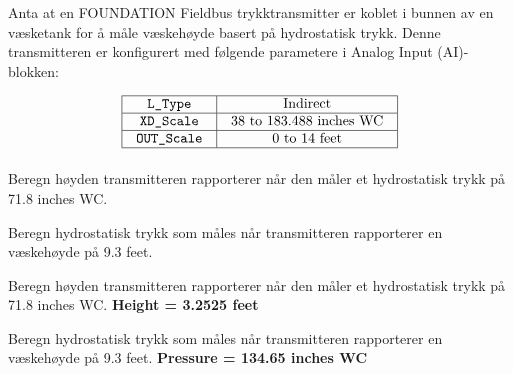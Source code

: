 

Anta at en FOUNDATION Fieldbus trykktransmitter er koblet i bunnen av en væsketank for å måle væskehøyde basert på hydrostatisk trykk. Denne transmitteren er konfigurert med følgende parametere i Analog Input (AI)-blokken:


$$\vbox{\offinterlineskip
\halign{\strut
\vrule \quad\hfil # \ \hfil & 
\vrule \quad\hfil # \ \hfil \vrule \cr
\noalign{\hrule}
%
{\tt L\_Type} & Indirect \cr
%
\noalign{\hrule}
%
{\tt XD\_Scale} & 38 to 183.488 inches WC \cr
%
\noalign{\hrule}
%
{\tt OUT\_Scale} & 0 to 14 feet \cr
%
\noalign{\hrule}
} %
}$$ %

\vskip 10pt

Beregn høyden transmitteren rapporterer når den måler et hydrostatisk trykk på 71.8 inches WC.

\vskip 10pt

Beregn hydrostatisk trykk som måles når transmitteren rapporterer en væskehøyde på 9.3 feet.

\vskip 10pt








Beregn høyden transmitteren rapporterer når den måler et hydrostatisk trykk på 71.8 inches WC.  {\bf Height = 3.2525 feet}

\vskip 10pt

Beregn hydrostatisk trykk som måles når transmitteren rapporterer en væskehøyde på 9.3 feet.  {\bf Pressure = 134.65 inches WC}










